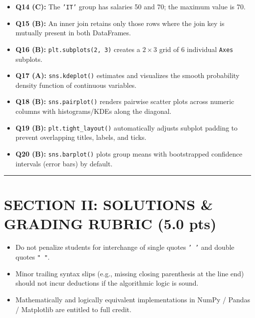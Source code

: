 \documentclass[11pt,a4paper]{article}
\begin{document}
\begin{itemize}[leftmargin=*,itemsep=1.5pt]
  \item \textbf{Q14 (C):} The \texttt{'IT'} group has salaries 50 and 70; the maximum value is 70.
  \item \textbf{Q15 (B):} An inner join retains only those rows where the join key is mutually present in both DataFrames.
  \item \textbf{Q16 (B):} \texttt{plt.subplots(2, 3)} creates a $2 \times 3$ grid of 6 individual \texttt{Axes} subplots.
  \item \textbf{Q17 (A):} \texttt{sns.kdeplot()} estimates and visualizes the smooth probability density function of continuous variables.
  \item \textbf{Q18 (B):} \texttt{sns.pairplot()} renders pairwise scatter plots across numeric columns with histograms/KDEs along the diagonal.
  \item \textbf{Q19 (B):} \texttt{plt.tight\_layout()} automatically adjusts subplot padding to prevent overlapping titles, labels, and ticks.
  \item \textbf{Q20 (B):} \texttt{sns.barplot()} plots group means with bootstrapped confidence intervals (error bars) by default.
\end{itemize}

\vspace{3mm}
\hrule
\vspace{2mm}

\section*{SECTION II: SOLUTIONS \& GRADING RUBRIC (5.0 pts)}

\begin{tcolorbox}[colback=gray!5!white,colframe=gray!60!black,title=\textbf{General Grading Policy for Evaluators}]
\small
\begin{itemize}[leftmargin=*,itemsep=1pt]
  \item Do not penalize students for interchange of single quotes \texttt{' '} and double quotes \texttt{" "}.
  \item Minor trailing syntax slips (e.g., missing closing parenthesis at the line end) should not incur deductions if the algorithmic logic is sound.
  \item Mathematically and logically equivalent implementations in NumPy / Pandas / Matplotlib are entitled to full credit.
\end{itemize}
\end{tcolorbox}
\end{document}
